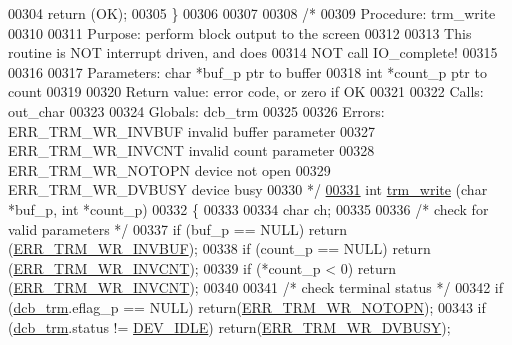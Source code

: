 \begin{DoxyCode}
00304         \textcolor{keywordflow}{return} (OK);
00305 \}
00306 
00307 
00308 \textcolor{comment}{/*}
00309 \textcolor{comment}{        Procedure: trm\_write}
00310 \textcolor{comment}{}
00311 \textcolor{comment}{        Purpose: perform block output to the screen}
00312 \textcolor{comment}{}
00313 \textcolor{comment}{        This routine is NOT interrupt driven, and does}
00314 \textcolor{comment}{        NOT call IO\_complete!}
00315 \textcolor{comment}{}
00316 \textcolor{comment}{}
00317 \textcolor{comment}{        Parameters:     char *buf\_p     ptr to buffer}
00318 \textcolor{comment}{                        int *count\_p ptr to count}
00319 \textcolor{comment}{}
00320 \textcolor{comment}{        Return value: error code, or zero if OK}
00321 \textcolor{comment}{}
00322 \textcolor{comment}{        Calls:  out\_char}
00323 \textcolor{comment}{}
00324 \textcolor{comment}{        Globals: dcb\_trm}
00325 \textcolor{comment}{}
00326 \textcolor{comment}{        Errors: ERR\_TRM\_WR\_INVBUF invalid buffer parameter}
00327 \textcolor{comment}{                ERR\_TRM\_WR\_INVCNT invalid count parameter}
00328 \textcolor{comment}{                ERR\_TRM\_WR\_NOTOPN device not open}
00329 \textcolor{comment}{                ERR\_TRM\_WR\_DVBUSY device busy}
00330 \textcolor{comment}{*/}
\hypertarget{trmdrive_8c_source_l00331}{}\hyperlink{trmdrive_8h_a348ab00f7a4abfced31c928644335fb6}{00331} \textcolor{keywordtype}{int} \hyperlink{trmdrive_8c_a348ab00f7a4abfced31c928644335fb6}{trm_write} (\textcolor{keywordtype}{char} *buf\_p, \textcolor{keywordtype}{int} *count\_p)
00332 \{
00333 
00334         \textcolor{keywordtype}{char}    ch;
00335 
00336         \textcolor{comment}{/* check for valid parameters */}
00337         \textcolor{keywordflow}{if} (buf\_p == NULL) \textcolor{keywordflow}{return} (\hyperlink{trmdrive_8h_a2b8ca84261c888152c1534d4255cc1bb}{ERR_TRM_WR_INVBUF});
00338         \textcolor{keywordflow}{if} (count\_p == NULL) \textcolor{keywordflow}{return} (\hyperlink{trmdrive_8h_a2135b20688c1210a7c0dcc12b6766435}{ERR_TRM_WR_INVCNT});
00339         \textcolor{keywordflow}{if} (*count\_p < 0) \textcolor{keywordflow}{return} (\hyperlink{trmdrive_8h_a2135b20688c1210a7c0dcc12b6766435}{ERR_TRM_WR_INVCNT});
00340 
00341         \textcolor{comment}{/* check terminal status */}
00342         \textcolor{keywordflow}{if} (\hyperlink{trmdrive_8c_aeecf5b41137f812666e981eebea04e61}{dcb_trm}.eflag\_p == NULL) \textcolor{keywordflow}{return}(\hyperlink{trmdrive_8h_a3c10e11f4e0cf603833fb7e5ea0899f1}{ERR_TRM_WR_NOTOPN});
00343         \textcolor{keywordflow}{if} (\hyperlink{trmdrive_8c_aeecf5b41137f812666e981eebea04e61}{dcb_trm}.status != \hyperlink{trmdrive_8c_a6f821c66a608d5628538df4c12dcf4b9}{DEV_IDLE}) \textcolor{keywordflow}{return}(\hyperlink{trmdrive_8h_ad0bb37a6e62d86a8b69f4ac6593c4375}{ERR_TRM_WR_DVBUSY});

\end{DoxyCode}
